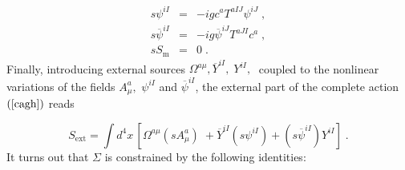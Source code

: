 \documentclass[a4paper,12pt]{article}
\begin{document}
\begin{eqnarray}
s\psi ^{iI} &=&-igc^{a}T^{aIJ}\psi ^{iJ}\;,  \label{spsi} \\
s\overline{\psi }^{iI} &=&-ig\overline{\psi }^{iJ}T^{aJI}c^{a}\;,  \nonumber
\\
sS_{\mathrm{m}} &=&0\;.  \nonumber
\end{eqnarray}
Finally, introducing external sources $\Omega ^{a\mu },\overline{Y}%
^{iI},\;Y^{iI},\;$ coupled to the nonlinear variations of the fields $A_{\mu
}^{a},$ $\psi ^{iI}$ and $\overline{\psi }^{iI}$, the external part of the
complete action $\left( \ref{cagh}\right) $ reads

\begin{equation}
S_{\mathrm{ext}}=\int d^{4}x\,\left[ \Omega ^{a\mu }\left( sA_{\mu
}^{a}\right) \;+\overline{Y}^{iI}\left( s\psi ^{iI}\right) +\left( s%
\overline{\psi }^{iI}\right) Y^{iI}\right] \;.  \label{extgh}
\end{equation}
It turns out that $\Sigma $ is constrained by the following identities:
\end{document}
